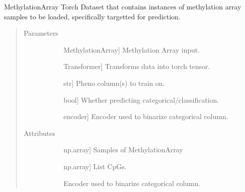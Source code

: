 \documentclass[letterpaper,10pt,english]{sphinxmanual}
\begin{document}

\begin{fulllineitems}
\label{\detokenize{index:methylnet.datasets.MethylationPredictionDataSet}}
MethylationArray Torch Dataset that contains instances of methylation array samples to be loaded, specifically targetted for prediction.
\begin{quote}\begin{description}
\item[{Parameters}] \leavevmode\begin{description}
\item[{}] \leavevmode{[}MethylationArray{]}
Methylation Array input.

\item[{}] \leavevmode{[}Transformer{]}
Transforms data into torch tensor.

\item[{}] \leavevmode{[}str{]}
Pheno column(s) to train on.

\item[{}] \leavevmode{[}bool{]}
Whether predicting categorical/classification.

\item[{}] \leavevmode{[}encoder{]}
Encoder used to binarize categorical column.

\end{description}

\item[{Attributes}] \leavevmode\begin{description}
\item[{}] \leavevmode{[}np.array{]}
Samples of MethylationArray

\item[{}] \leavevmode{[}np.array{]}
List CpGs.

\item[{}] \leavevmode
Encoder used to binarize categorical column.


\end{description}
\end{description}
\end{quote}
\end{fulllineitems}
\end{document}
